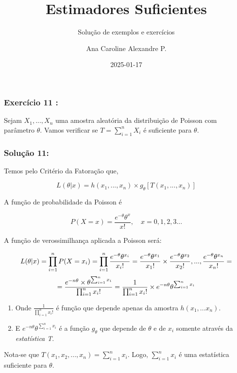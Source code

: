 \documentclass[
  letterpaper,
  DIV=11,
  numbers=noendperiod]{scrartcl}
\title{Estimadores Suficientes}
\subtitle{Solução de exemplos e exercícios}
\author{Ana Caroline Alexandre P.}
\date{2025-01-17}
\begin{document}
\maketitle


\subsubsection{Exercício 11 :}\label{exercuxedcio-11}

Sejam \(X_1,..., X_n\) uma amostra aleatória da distribuição de Poisson
com parâmetro \(θ\). Vamos verificar se \(T = \sum_{i=1}^{n} X_i\) é
suficiente para \(\theta\).

\subsubsection{Solução 11:}\label{soluuxe7uxe3o-11}

Temos pelo Critério da Fatoração que,

\[
L(\theta|x)= h(x_1,...,x_n)\times g_\theta[T(x_1,...,x_n)]
\]

A função de probabilidade da Poisson é

\[
P(X=x) = \frac{e^{-\theta}\theta^x}{x!} , \quad x=0,1,2,3...
\]

A função de verossimilhança aplicada a Poisson será:

\[L(\theta|x)=\prod_{i=1}^{n} P(X = x_i) = \prod_{i=1}^{n} \frac{e^{-\theta}\theta^{x_i}}{x_i!}
\\=\frac{e^{-\theta}\theta^{x_1}}{x_1!}\times\frac{e^{-\theta}\theta^{x_2}}{x_2!},...,\frac{e^{-\theta}\theta^{x_n}}{x_n!}=
\]
\[=\frac{e^{-n\theta}\times\theta^{\sum_{i=1}^{n}x_i}}{\prod_{i=1}^{n}x_i!}=\\
\frac{1}{\prod_{i=1}^{n}x_i!}\times{e^{-n\theta}\theta^{\sum_{i=1}^{n}x_i}}
\]

\begin{enumerate}
\def\labelenumi{\arabic{enumi}.}
\item
  Onde \(\frac{1}{\prod_{i=1}^{n}x_i!}\) é função que depende apenas da
  amostra \(h(x_1,...x_n)\).
\item
  E \({e^{-n\theta}\theta^{\sum_{i=1}^{n}x_i}}\) é a função \(g_\theta\)
  que depende de \(\theta\) e de \(x_i\) somente através da
  \emph{estatística T}.
\end{enumerate}

Nota-se que \(T(x_1,x_2,...,x_n)=\sum_{i = 1}^{n} x_{i}\). Logo,
\(\sum_{i = 1}^{n} x_{i}\) é uma estatística suficiente para \(\theta\).
\end{document}
